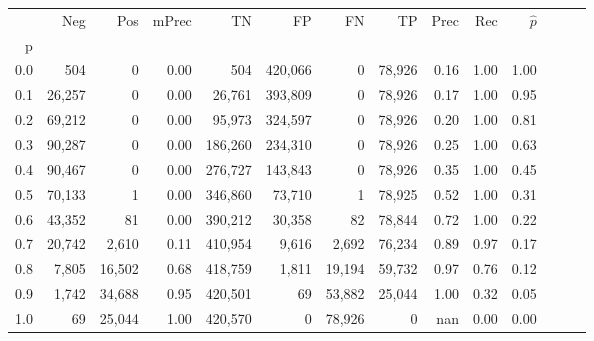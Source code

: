 \begin{tabular}{rrrrrrrrrrrrrr}
\toprule
{} &     Neg &     Pos & mPrec &       TN &       FP &      FN &      TP &  Prec &   Rec & $\hat{p}$ \\
p   &         &         &       &          &          &         &         &       &       &           \\
\midrule
0.0 &     504 &       0 &  0.00 &      504 &  420,066 &       0 &  78,926 &  0.16 &  1.00 &      1.00 \\
0.1 &  26,257 &       0 &  0.00 &   26,761 &  393,809 &       0 &  78,926 &  0.17 &  1.00 &      0.95 \\
0.2 &  69,212 &       0 &  0.00 &   95,973 &  324,597 &       0 &  78,926 &  0.20 &  1.00 &      0.81 \\
0.3 &  90,287 &       0 &  0.00 &  186,260 &  234,310 &       0 &  78,926 &  0.25 &  1.00 &      0.63 \\
0.4 &  90,467 &       0 &  0.00 &  276,727 &  143,843 &       0 &  78,926 &  0.35 &  1.00 &      0.45 \\
0.5 &  70,133 &       1 &  0.00 &  346,860 &   73,710 &       1 &  78,925 &  0.52 &  1.00 &      0.31 \\
0.6 &  43,352 &      81 &  0.00 &  390,212 &   30,358 &      82 &  78,844 &  0.72 &  1.00 &      0.22 \\
0.7 &  20,742 &   2,610 &  0.11 &  410,954 &    9,616 &   2,692 &  76,234 &  0.89 &  0.97 &      0.17 \\
0.8 &   7,805 &  16,502 &  0.68 &  418,759 &    1,811 &  19,194 &  59,732 &  0.97 &  0.76 &      0.12 \\
0.9 &   1,742 &  34,688 &  0.95 &  420,501 &       69 &  53,882 &  25,044 &  1.00 &  0.32 &      0.05 \\
1.0 &      69 &  25,044 &  1.00 &  420,570 &        0 &  78,926 &       0 &   nan &  0.00 &      0.00 \\
\bottomrule
\end{tabular}

